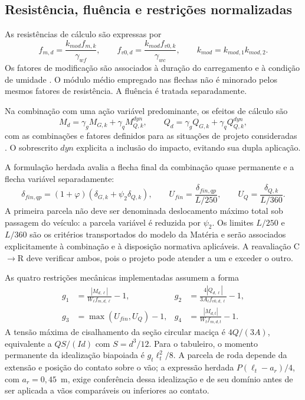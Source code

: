 \subsection{Resistência, fluência e restrições normalizadas}\label{sec:restricoes}

As resistências de cálculo são expressas por
\begin{equation}
 f_{m,d}=\frac{k_{mod}f_{m,k}}{\gamma_{wf}},\qquad
 f_{v0,d}=\frac{k_{mod}f_{v0,k}}{\gamma_{wc}},\qquad
 k_{mod}=k_{mod,1}k_{mod,2}.
\label{eq:resistencias_modelo}
\end{equation}
Os fatores de modificação são associados à duração do carregamento e à condição de umidade \parencite{NBR7190-1:2022}. O módulo médio empregado nas flechas não é minorado pelos mesmos fatores de resistência. A fluência é tratada separadamente.

Na combinação com uma ação variável predominante, os efeitos de cálculo são
\begin{equation}
 M_d=\gamma_gM_{G,k}+\gamma_qM_{Q,k}^{dyn},\qquad
 Q_d=\gamma_gQ_{G,k}+\gamma_qQ_{Q,k}^{dyn},
\label{eq:combinacao_modelo}
\end{equation}
com as combinações e fatores definidos para as situações de projeto consideradas \parencite{NBR8681:2025}. O sobrescrito $dyn$ explicita a inclusão do impacto, evitando sua dupla aplicação.

A formulação herdada avalia a flecha final da combinação quase permanente e a flecha variável separadamente:
\begin{equation}
 \delta_{fin,qp}=(1+\varphi)(\delta_{G,k}+\psi_2\delta_{Q,k}),\qquad
 U_{fin}=\frac{\delta_{fin,qp}}{L/250},\qquad
 U_Q=\frac{\delta_{Q,k}}{L/360}.
\label{eq:servico_modelo}
\end{equation}
A primeira parcela não deve ser denominada deslocamento máximo total sob passagem do veículo: a parcela variável é reduzida por $\psi_2$. Os limites $L/250$ e $L/360$ são os critérios transportados do modelo da Matéria e serão associados explicitamente à combinação e à disposição normativa aplicáveis. A reavaliação C$\rightarrow$R deve verificar ambos, pois o projeto pode atender a um e exceder o outro.

As quatro restrições mecânicas implementadas assumem a forma
\begin{align}
 g_1&=\frac{|M_{d,\ell}|}{W_\ell f_{m,d,\ell}}-1,&
 g_2&=\frac{4|Q_{d,\ell}|}{3A_\ell f_{v0,d,\ell}}-1,\label{eq:g12}\\
 g_3&=\max(U_{fin},U_Q)-1,&
 g_4&=\frac{|M_{d,t}|}{W_t f_{m,d,t}}-1.
\label{eq:g34}
\end{align}
A tensão máxima de cisalhamento da seção circular maciça é $4Q/(3A)$, equivalente a $QS/(Id)$ com $S=d^3/12$. Para o tabuleiro, o momento permanente da idealização biapoiada é $g_t\ell_t^2/8$. A parcela de roda depende da extensão e posição do contato sobre o vão; a expressão herdada $P(\ell_t-a_r)/4$, com $a_r=0{,}45$~m, exige conferência dessa idealização e de seu domínio antes de ser aplicada a vãos comparáveis ou inferiores ao contato.

